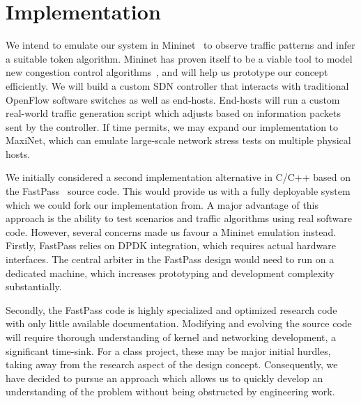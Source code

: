 

\section{Implementation}
\label{sec:implementation}
We intend to emulate our system in Mininet~\cite{mininet} to observe traffic 
patterns and infer a suitable token algorithm. Mininet has proven itself to be 
a viable tool to model new congestion control 
algorithms~\cite{mininet_learning}, and will help us prototype our concept 
efficiently. We will build a custom SDN controller that interacts with 
traditional OpenFlow software switches as well as end-hosts. End-hosts will run 
a custom real-world traffic generation script which adjusts based on 
information packets sent by the controller.
If time permits, we may expand our implementation to MaxiNet, which can emulate 
large-scale network stress tests on multiple physical hosts.

We initially considered a second implementation alternative in C/C++ based on 
the FastPass~\cite{fastpass} source code. This would provide us with a fully 
deployable system which we could fork our implementation from. A major 
advantage of this approach is the ability to test scenarios and traffic 
algorithms using real software code.
However, several concerns made us favour a Mininet emulation instead.
Firstly, FastPass relies on DPDK integration, which requires actual hardware 
interfaces. The central arbiter in the FastPass design would need to run on a 
dedicated machine, which increases prototyping and development complexity 
substantially.

Secondly, the FastPass code is highly specialized and optimized research code 
with only little available documentation. Modifying and evolving the source 
code will require thorough understanding of kernel and networking development, 
a significant time-sink. For a class project, these may be major initial 
hurdles, taking away from the research aspect of the design concept.
Consequently, we have decided to pursue an approach which allows us to quickly 
develop an understanding of the problem without being obstructed by engineering 
work.

